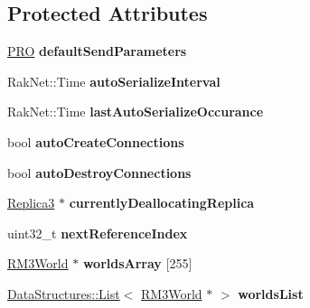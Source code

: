 \subsection*{Protected Attributes}
\begin{DoxyCompactItemize}
\item 
\hypertarget{class_rak_net_1_1_replica_manager3_a74780f843ae2a3d20df48a1f74661c28}{\hyperlink{struct_rak_net_1_1_p_r_o}{P\-R\-O} {\bfseries default\-Send\-Parameters}}\label{class_rak_net_1_1_replica_manager3_a74780f843ae2a3d20df48a1f74661c28}

\item 
\hypertarget{class_rak_net_1_1_replica_manager3_a7d6a49043f4dff9ed52d777c2a16fb87}{Rak\-Net\-::\-Time {\bfseries auto\-Serialize\-Interval}}\label{class_rak_net_1_1_replica_manager3_a7d6a49043f4dff9ed52d777c2a16fb87}

\item 
\hypertarget{class_rak_net_1_1_replica_manager3_a301533367b285743a378ffa7d01e14fb}{Rak\-Net\-::\-Time {\bfseries last\-Auto\-Serialize\-Occurance}}\label{class_rak_net_1_1_replica_manager3_a301533367b285743a378ffa7d01e14fb}

\item 
\hypertarget{class_rak_net_1_1_replica_manager3_af56dd5b948079d497ea351fd0629c15c}{bool {\bfseries auto\-Create\-Connections}}\label{class_rak_net_1_1_replica_manager3_af56dd5b948079d497ea351fd0629c15c}

\item 
\hypertarget{class_rak_net_1_1_replica_manager3_a4b3e239b12fb33801347933b0ff88a5f}{bool {\bfseries auto\-Destroy\-Connections}}\label{class_rak_net_1_1_replica_manager3_a4b3e239b12fb33801347933b0ff88a5f}

\item 
\hypertarget{class_rak_net_1_1_replica_manager3_a402f8a1c343a73a57481251679704cc5}{\hyperlink{class_rak_net_1_1_replica3}{Replica3} $\ast$ {\bfseries currently\-Deallocating\-Replica}}\label{class_rak_net_1_1_replica_manager3_a402f8a1c343a73a57481251679704cc5}

\item 
\hypertarget{class_rak_net_1_1_replica_manager3_a36dee24223eb18e4bc0684292b94ad49}{uint32\-\_\-t {\bfseries next\-Reference\-Index}}\label{class_rak_net_1_1_replica_manager3_a36dee24223eb18e4bc0684292b94ad49}

\item 
\hypertarget{class_rak_net_1_1_replica_manager3_a63df85e211a932bc111683abbc5a3879}{\hyperlink{struct_rak_net_1_1_replica_manager3_1_1_r_m3_world}{R\-M3\-World} $\ast$ {\bfseries worlds\-Array} \mbox{[}255\mbox{]}}\label{class_rak_net_1_1_replica_manager3_a63df85e211a932bc111683abbc5a3879}

\item 
\hypertarget{class_rak_net_1_1_replica_manager3_a94a5b95fc75cde98c82627c41ab8a3a2}{\hyperlink{class_data_structures_1_1_list}{Data\-Structures\-::\-List}$<$ \hyperlink{struct_rak_net_1_1_replica_manager3_1_1_r_m3_world}{R\-M3\-World} $\ast$ $>$ {\bfseries worlds\-List}}\label{class_rak_net_1_1_replica_manager3_a94a5b95fc75cde98c82627c41ab8a3a2}

\end{DoxyCompactItemize}
